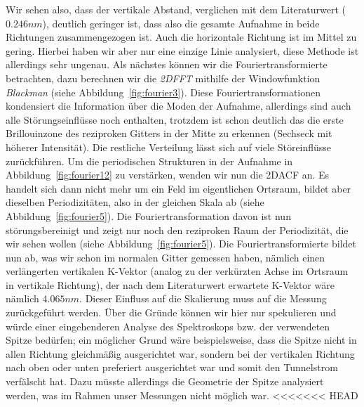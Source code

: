 Wir sehen also, dass der vertikale Abstand, verglichen mit dem Literaturwert ($0.246nm$), deutlich
geringer ist, dass also die gesamte Aufnahme in beide Richtungen zusammengezogen ist. 
Auch die horizontale Richtung ist im Mittel zu gering. Hierbei haben wir aber nur eine einzige
Linie analysiert, diese Methode ist allerdings sehr ungenau. 
Als nächstes können wir die Fouriertransformierte betrachten, dazu
berechnen wir die \textit{2DFFT} mithilfe der Windowfunktion \textit{Blackman} 
(siehe Abbildung~\ref{fig:fourier3}). Diese Fouriertransformationen kondensiert die Information
über die Moden der Aufnahme, allerdings sind auch alle Störungseinflüsse noch enthalten, trotzdem
ist schon deutlich das die erste Brillouinzone des reziproken Gitters in der Mitte zu erkennen
(Sechseck mit höherer Intensität). Die restliche Verteilung lässt sich auf viele Störeinflüsse
zurückführen. Um die periodischen Strukturen in der Aufnahme in Abbildung~\ref{fig:fourier12} zu
verstärken, wenden wir nun die 2DACF an. Es handelt sich dann nicht mehr um ein Feld im 
eigentlichen Ortsraum, bildet aber dieselben Periodizitäten, also in der gleichen Skala ab
(siehe Abbildung~\ref{fig:fourier5}). Die Fouriertransformation davon ist nun störungsbereinigt
und zeigt nur noch den reziproken Raum der Periodizität, die wir sehen wollen
(siehe Abbildung~\ref{fig:fourier5}). Die Fouriertransformierte bildet nun ab, was wir schon
im normalen Gitter gemessen haben, nämlich einen verlängerten vertikalen K-Vektor (analog
zu der verkürzten Achse im Ortsraum in vertikale Richtung), der nach dem Literaturwert 
erwartete K-Vektor wäre nämlich $4.065nm$. Dieser Einfluss auf die Skalierung
muss auf die Messung zurückgeführt werden. Über die Gründe können wir hier nur spekulieren und 
würde einer eingehenderen Analyse des Spektroskops bzw. der verwendeten Spitze bedürfen; 
ein möglicher Grund wäre beispielsweise, dass die Spitze nicht in allen Richtung gleichmäßig 
ausgerichtet war, sondern bei der vertikalen Richtung nach oben oder unten preferiert ausgerichtet
war und somit den Tunnelstrom verfälscht hat. Dazu müsste allerdings die Geometrie der Spitze 
analysiert werden, was im Rahmen unser Messungen nicht möglich war.
<<<<<<< HEAD
